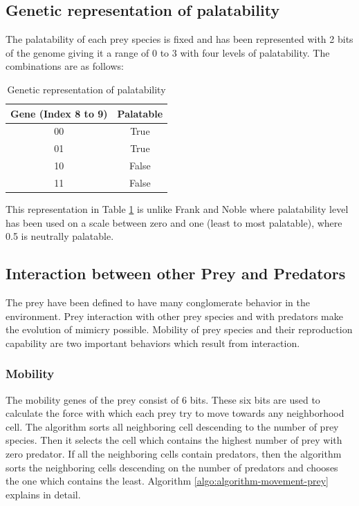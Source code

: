 \subsection{Genetic representation of palatability}
\label{sec:genetic-palatability-representation}
The palatability of each prey species is fixed and has been represented with 2 bits of the genome giving it a range of 0 to 3 with four levels of palatability. The combinations are as follows:

\begin{table}[H]
	\centering
	\begin{tabular}{|c|c|}
		\hline
			\textbf{Gene (Index 8 to 9)} &	\textbf{Palatable} \\ \hline
			00									& True 			\\ \hline
			01									& True 			\\ \hline
			10									& False 		\\ \hline
			11									& False 		\\
		\hline
	\end{tabular}
	\caption{Genetic representation of palatability}
	\label{tab:genetic-representation-palatability}
\end{table}

This representation in Table \ref{tab:genetic-representation-palatability} is unlike Frank and Noble \cite{franks2003} where palatability level has been used on a scale between zero and one (least to most palatable), where 0.5 is neutrally palatable. 

\subsection{Interaction between other Prey and Predators}
The prey have been defined to have many conglomerate behavior in the environment. Prey interaction with other prey species and with predators make the evolution of mimicry possible. Mobility of prey species and their reproduction capability are two important behaviors which result from interaction. 

\subsubsection{Mobility}
The mobility genes of the prey consist of 6 bits. These six bits are used to calculate the force with which each prey try to move towards any neighborhood cell. The algorithm sorts all neighboring cell descending to the number of prey species. Then it selects the cell which contains the highest number of prey with zero predator. If all the neighboring cells contain predators, then the algorithm sorts the neighboring cells descending on the number of predators and chooses the one which contains the least. Algorithm \ref{algo:algorithm-movement-prey} explains in detail.

